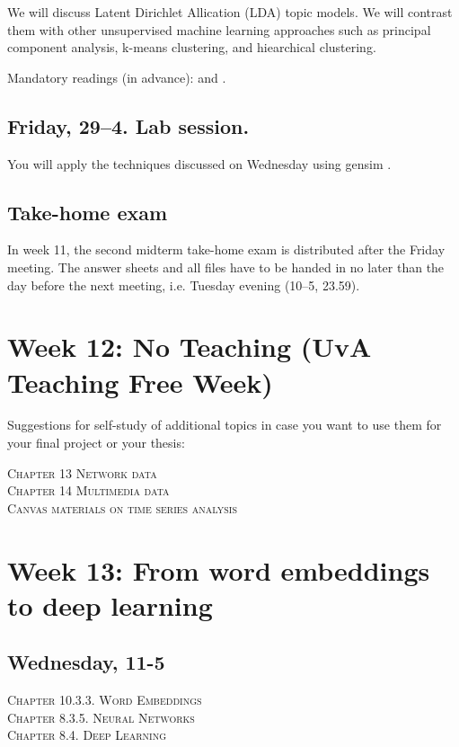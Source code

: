 We will discuss Latent Dirichlet Allication (LDA) topic models. We will contrast them with other unsupervised machine learning approaches such as principal component analysis, k-means clustering, and hiearchical clustering.

Mandatory readings (in advance): \cite{Maier2018a} and \cite{Tsur2015}.

\subsection*{Friday, 29--4. Lab session.}
You will apply the techniques discussed on Wednesday using gensim \citep{Rehurek2010}.



\subsection*{Take-home exam}
In week 11, the second midterm take-home exam is distributed after the Friday meeting. The answer sheets and all files have to be handed in no later than the day before the next meeting, i.e. Tuesday evening (10--5, 23.59).




\section*{Week 12: No Teaching (UvA Teaching Free Week)}
Suggestions for self-study of additional topics in case you want to use them for your final project or your thesis:

\noindent \textsc{ Chapter 13 Network data}\\
\textsc{ Chapter 14 Multimedia data}\\
\textsc{ Canvas materials on time series analysis}\\





\section*{Week 13: From word embeddings to deep learning}

\subsection*{Wednesday, 11-5}
\textsc{ Chapter 10.3.3. Word Embeddings}\\
\textsc{ Chapter 8.3.5. Neural Networks}\\
\textsc{ Chapter 8.4. Deep Learning}\\

